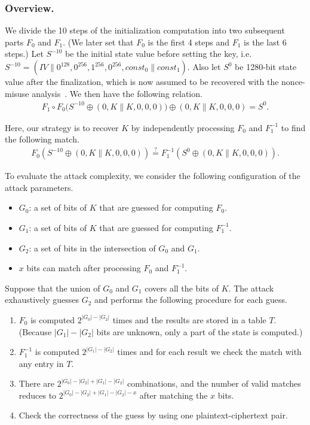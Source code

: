 \subsubsection{Overview.}
We divide the 10 steps of the initialization computation into two subsequent parts $F_0$ and $F_1$. (We later set that $F_0$ is the first 4 steps and $F_1$ is the last 6 steps.) Let $S^{-10}$ be the initial state value before setting the key, i.e.~$S^{-10} = (IV\|0^{128},0^{256},1^{256},0^{256},const_0\|const_1)$. Also let $S^0$ be 1280-bit state value after the finalization, which is now assumed to be recovered with the nonce-misuse analysis~\cite{cryptoeprint:2017:1137}. We then have the following relation.
\begin{align*}
F_1 \circ F_0 \bigl(S^{-10} \oplus (0, K\|K, 0, 0, 0)\bigr) \oplus (0,K\|K,0,0,0) = S^0.
\end{align*}

Here, our strategy is to recover $K$ by independently processing $F_0$ and $F_1^{-1}$ to find the following match.
\begin{align*}
F_0 (S^{-10} \oplus (0, K\|K, 0, 0, 0)) \stackrel{?}{=} F_1^{-1} (S^0 \oplus (0,K\|K,0,0,0)).
\end{align*}

To evaluate the attack complexity, we consider the following configuration of the attack parameters.
\begin{itemize}
\item $G_0$: a set of bits of $K$ that are guessed for computing $F_0$.
\item $G_1$: a set of bits of $K$ that are guessed for computing $F_1^{-1}$.
\item $G_2$: a set of bits in the intersection of $G_0$ and $G_1$.
\item $x$ bits can match after processing $F_0$ and $F_1^{-1}$.
\end{itemize}
Suppose that the union of $G_0$ and $G_1$ covers all the bits of $K$. The attack exhaustively guesses $G_2$ and performs the following procedure for each guess.
\begin{enumerate}
\item $F_0$ is computed $2^{|G_0|-|G_2|}$ times and the results are stored in a table $T$. (Because $|G_1|-|G_2|$ bits are unknown, only a part of the state is computed.)
\item $F_1^{-1}$ is computed $2^{|G_1|-|G_2|}$ times and for each result we check the match with any entry in $T$.
\item There are $2^{|G_0|-|G_2| + |G_1|-|G_2|}$ combinations, and the number of valid matches reduces to $2^{|G_0|-|G_2| + |G_1|-|G_2| - x}$ after matching the $x$ bits.
\item Check the correctness of the guess by using one plaintext-ciphertext pair.
\end{enumerate}

